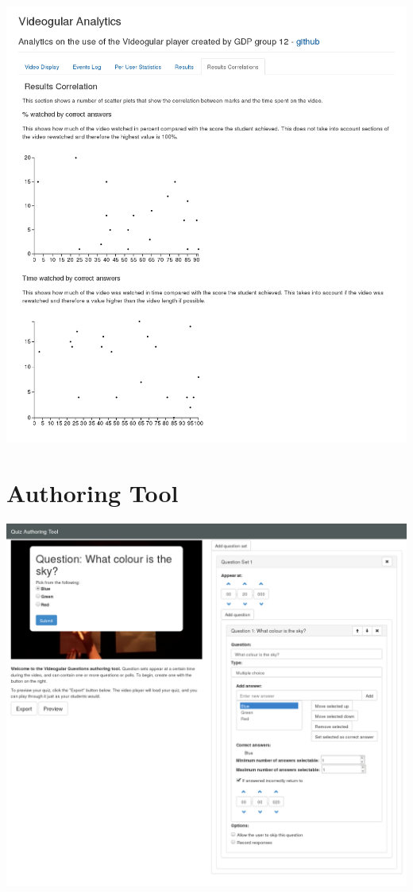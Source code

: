 \includegraphics[width=\textwidth]{screenshots/videogular-analytics-results-correlations.png}

\section{Authoring Tool}

\includegraphics[width=\textwidth]{screenshots/authoring-tool.png}
